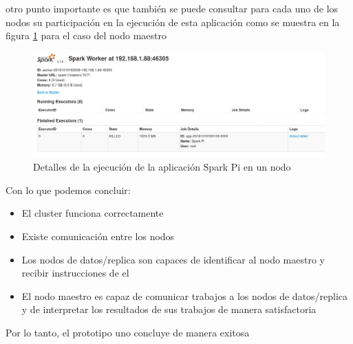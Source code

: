otro punto importante es que también se puede consultar para cada uno de los nodos su participación en la ejecución de esta aplicación como se muestra en la figura \ref{fig:red8} para el caso del nodo maestro
\newpage
\begin{figure}[!htbp]
	\hypertarget{fig:red8}{\hspace{1pt}}
	\begin{center}
		\includegraphics[width=.7\textwidth]{capitulo3/images/im11.png}
		\caption{Detalles de la ejecución de la aplicación Spark Pi en un nodo}
		\label{fig:red8}
	\end{center}
\end{figure}

Con lo que podemos concluir:
\begin{itemize}
	\item El cluster funciona correctamente
	\item Existe comunicación entre los nodos
	\item Los nodos de datos/replica son capaces de identificar al nodo maestro y recibir instrucciones de el
	\item El nodo maestro es capaz de comunicar trabajos a los nodos de datos/replica y de interpretar los resultados de sus trabajos de manera satisfactoria
\end{itemize}
Por lo tanto, el prototipo uno concluye de manera exitosa

